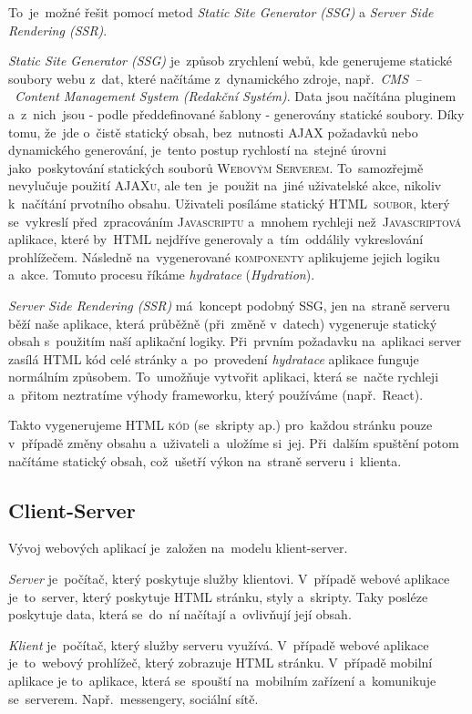 \documentclass[14pt,a4paper]{article}
\begin{document}
To~je~možné řešit pomocí metod \emph{Static Site Generator (SSG)} a \emph{Server Side Rendering (SSR)}.

\emph{Static Site Generator (SSG)} je~způsob zrychlení webů, kde generujeme statické soubory webu z~dat, které načítáme z~dynamického zdroje, např.~\emph{CMS~--~Content Management System (Redakční Systém)}. Data jsou načítána pluginem a~z~nich~jsou - podle předdefinované šablony - generovány statické soubory. Díky tomu, že~jde o~čistě statický obsah, bez~nutnosti \textsc{AJAX} požadavků nebo dynamického generování, je~tento postup rychlostí na~stejné úrovni jako~poskytování statických souborů \textsc{Webovým Serverem}. To~samozřejmě nevylučuje použití \textsc{AJAXu}, ale ten~je~použit na~jiné uživatelské akce, nikoliv k~načítání prvotního obsahu.
Uživateli posíláme statický \textsc{HTML~soubor}, který se~vykreslí před~zpracováním \textsc{Javascriptu} a~mnohem rychleji než~\textsc{Javascriptová} aplikace, které by~HTML nejdříve generovaly a~tím~oddálily vykreslování prohlížečem. Následně na~vygenerované \textsc{komponenty} aplikujeme jejich logiku a~akce. Tomuto procesu říkáme \emph{hydratace} (\emph{Hydration}).


\emph{Server Side Rendering (SSR)} má~koncept podobný \textsc{SSG}, jen na~straně serveru běží naše aplikace, která průběžně (při~změně v~datech) vygeneruje statický obsah s~použitím naší aplikační logiky. Při~prvním požadavku na~aplikaci server zasílá \textsc{HTML} kód celé stránky a~po~provedení \emph{hydratace} aplikace funguje normálním způsobem. To~umožňuje vytvořit aplikaci, která se~načte rychleji a~přitom neztratíme výhody frameworku, který používáme (např.~React). \cite{uc:ssrandssg}

Takto vygenerujeme \textsc{HTML kód} (se~skripty ap.) pro~každou stránku pouze v~případě změny obsahu a~uživateli a~uložíme si~jej. Při~dalším spuštění potom načítáme statický obsah, což~ušetří výkon na~straně serveru i~klienta.

\subsection{Client-Server}
Vývoj webových aplikací je~založen na~modelu klient-server.

\emph{Server} je~počítač, který poskytuje služby klientovi. V~případě webové aplikace je~to~server, který poskytuje HTML stránku, styly a~skripty.
Taky posléze poskytuje data, která se~do~ní načítají a~ovlivňují její obsah.

        \emph{Klient} je~počítač, který služby serveru využívá. V~případě webové aplikace je~to~webový prohlížeč, který zobrazuje HTML stránku.
        V~případě mobilní aplikace je to~aplikace, která se~spouští na~mobilním zařízení a~komunikuje se~serverem. Např.~messengery, sociální sítě. \cite{ClientServer}
        
\end{document}
